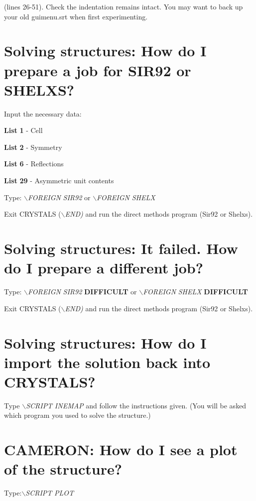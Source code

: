 \documentclass[10pt,a4paper]{report}
\begin{document}
(lines 26-51). Check the indentation remains intact. You may
want to back up your old guimenu.srt when first experimenting.

\section{Solving structures: How do I prepare a job for SIR92 or SHELXS?}


 Input the necessary data:




 {\bf List} {\bf 1} - Cell


 {\bf List} {\bf 2} - Symmetry


 {\bf List} {\bf 6} - Reflections


 {\bf List} {\bf 29} - Asymmetric unit contents



 Type: \emph{$\backslash$FOREIGN} \emph{SIR92} or \emph{$\backslash$FOREIGN} \emph{SHELX} 




 Exit CRYSTALS (\emph{$\backslash$END)} and run the direct methods
program (Sir92 or Shelxs).

\section{Solving structures: It failed. How do I prepare a different job?}


 Type: \emph{$\backslash$FOREIGN} \emph{SIR92} {\bf DIFFICULT} or \emph{$\backslash$FOREIGN} \emph{SHELX} {\bf DIFFICULT} 




 Exit CRYSTALS (\emph{$\backslash$END)} and run the direct methods
program (Sir92 or Shelxs).

\section{Solving structures: How do I import the solution back into CRYSTALS?}


Type \emph{$\backslash$SCRIPT} \emph{INEMAP} and follow the
instructions given. (You will be asked which program you
used to solve the structure.)

\section{CAMERON: How do I see a plot of the structure?}


Type:\emph{$\backslash$SCRIPT} \emph{PLOT}
\end{document}
